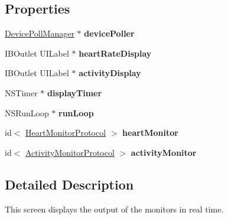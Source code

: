 \subsection*{Properties}
\begin{DoxyCompactItemize}
\item 
\hypertarget{interface_graph_v_c_a8a00c63cc6cab8b3c1cddaaacc9d12fc}{\hyperlink{interface_device_poll_manager}{Device\-Poll\-Manager} $\ast$ {\bfseries device\-Poller}}\label{interface_graph_v_c_a8a00c63cc6cab8b3c1cddaaacc9d12fc}

\item 
\hypertarget{interface_graph_v_c_ad434b1d838f58441c9d6499936ccd620}{I\-B\-Outlet U\-I\-Label $\ast$ {\bfseries heart\-Rate\-Display}}\label{interface_graph_v_c_ad434b1d838f58441c9d6499936ccd620}

\item 
\hypertarget{interface_graph_v_c_a75fd5eb6ebad27cbce29475d94459329}{I\-B\-Outlet U\-I\-Label $\ast$ {\bfseries activity\-Display}}\label{interface_graph_v_c_a75fd5eb6ebad27cbce29475d94459329}

\item 
\hypertarget{interface_graph_v_c_a5ef6730daa124f69087996078418db0d}{N\-S\-Timer $\ast$ {\bfseries display\-Timer}}\label{interface_graph_v_c_a5ef6730daa124f69087996078418db0d}

\item 
\hypertarget{interface_graph_v_c_aaeee6afe374009cd16e4a6a1d2270efa}{N\-S\-Run\-Loop $\ast$ {\bfseries run\-Loop}}\label{interface_graph_v_c_aaeee6afe374009cd16e4a6a1d2270efa}

\item 
\hypertarget{interface_graph_v_c_ab4c3c7d6990f1e3be550b443e2c7a532}{id$<$ \hyperlink{protocol_heart_monitor_protocol-p}{Heart\-Monitor\-Protocol} $>$ {\bfseries heart\-Monitor}}\label{interface_graph_v_c_ab4c3c7d6990f1e3be550b443e2c7a532}

\item 
\hypertarget{interface_graph_v_c_a0216f83efd648d18c90793fd67206ad8}{id$<$ \hyperlink{protocol_activity_monitor_protocol-p}{Activity\-Monitor\-Protocol} $>$ {\bfseries activity\-Monitor}}\label{interface_graph_v_c_a0216f83efd648d18c90793fd67206ad8}

\end{DoxyCompactItemize}


\subsection{Detailed Description}
This screen displays the output of the monitors in real time. 

